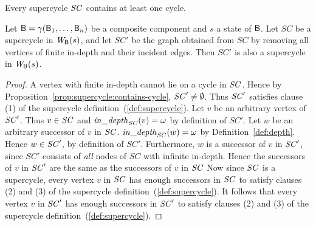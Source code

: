 \begin{proposition} \label{prop:supercycle:contains-cycle}
Every supercycle $\mathit{SC}$ contains at least one cycle.
\end{proposition} 
%
%



\begin{proposition} \label{prop:supercycle:essential-subgraph-of} Let $\mathsf{B} =
\gamma(\mathsf{B}_1,\dots,\mathsf{B}_n)$ be a composite component and $s$ a state of
$\mathsf{B}$.  Let $SC$ be a supercycle in $\mathit{W}_{\mathsf{B}}({s})$, and let $SC'$ be the
graph obtained from $SC$ by removing all vertices of finite in-depth
and their incident edges. Then $SC'$ is also a supercycle in
$\mathit{W}_{\mathsf{B}}({s})$. 
\end{proposition} 
%
%
\begin{proof}
A vertex with finite in-depth cannot lie on a cycle in $\mathit{SC}$.  Hence
by Proposition~\ref{prop:supercycle:contains-cycle}, $\mathit{SC}' \neq
\emptyset$. Thus $\mathit{SC}'$ satisfies clause (1) of the supercycle
definition~(\ref{def:supercycle}).
%
Let $v$ be an arbitrary vertex of $\mathit{SC}'$.  Thus $v \in \mathit{SC}$ and $\mathit{in\_depth}_{\mathit{SC}}({v}) = \omega$ by definition of $SC'$. Let
$w$ be an arbitrary successor of $v$ in $\mathit{SC}$. $\mathit{in\_depth}_{\mathit{SC}}({w}) = \omega$ by Definition~\ref{def:depth}. Hence
$w \in \mathit{SC}'$, by definition of $SC'$.  Furthermore, $w$ is a successor of $v$ in $\mathit{SC}'$, since $SC'$ consists of
\emph{all} nodes of $SC$ with infinite in-depth. Hence the successors of $v$ in $\mathit{SC}'$ are
the same as the successors of $v$ in $\mathit{SC}$
%
%
Now since $\mathit{SC}$ is a supercycle, every vertex $v$ in $\mathit{SC}$ has enough successors in $\mathit{SC}$ to satisfy clauses (2) and (3)
of the supercycle definition~(\ref{def:supercycle}). It follows that every vertex $v$ in $\mathit{SC}'$ has enough successors in
$\mathit{SC}'$ to satisfy clauses (2) and (3) of the supercycle definition~(\ref{def:supercycle}).  
\end{proof}


